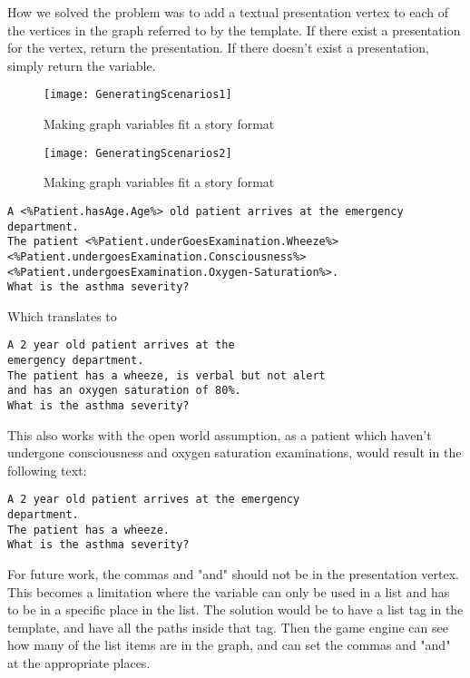 How we solved the problem was to add a textual presentation vertex to each of the vertices in the graph referred to by the template. If there exist a presentation for the vertex, return the presentation. If there doesn't exist a presentation, simply return the variable.

\begin{figure}[h!]
	\caption {Making graph variables fit a story format}
	\label{fig:GeneratingScenarios1}
	\texttt{[image: GeneratingScenarios1]}
\end{figure}

\begin{figure}[h!]
	\caption {Making graph variables fit a story format}
	\label{fig:GeneratingScenarios2}
	\texttt{[image: GeneratingScenarios2]}
\end{figure}

\begin{lstlisting}[caption={Question template}, frame=single] 
A <%Patient.hasAge.Age%> old patient arrives at the emergency department. 
The patient <%Patient.underGoesExamination.Wheeze%> 
<%Patient.undergoesExamination.Consciousness%> 
<%Patient.undergoesExamination.Oxygen-Saturation%>. 
What is the asthma severity? 
\end{lstlisting}

Which translates to 
\begin{lstlisting}[caption={Question instantiation}, frame=single] 
A 2 year old patient arrives at the 
emergency department. 
The patient has a wheeze, is verbal but not alert 
and has an oxygen saturation of 80%. 
What is the asthma severity? 
\end{lstlisting}

This also works with the open world assumption, as a patient which haven't undergone consciousness and oxygen saturation examinations, would result in the following text:

\begin{lstlisting}[caption={Question instantiation}, frame=single] 
A 2 year old patient arrives at the emergency 
department. 
The patient has a wheeze. 
What is the asthma severity? 
\end{lstlisting}

For future work, the commas and "and" should not be in the presentation vertex. This becomes a limitation where the variable can only be used in a list and has to be in a specific place in the list. The solution would be to have a list tag in the template, and have all the paths inside that tag. Then the game engine can see how many of the list items are in the graph, and can set the commas and "and" at the appropriate places.

